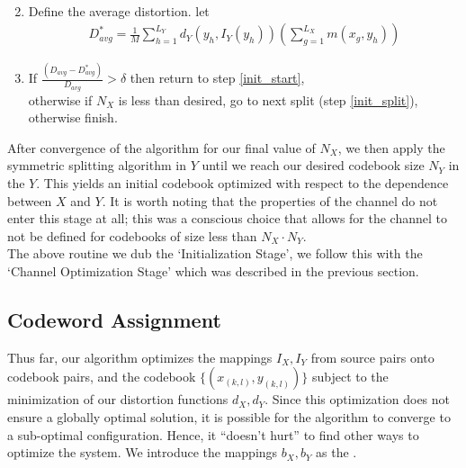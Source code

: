 \begin{enumerate}
\begin{align}
    \end{align}
    \item Define the average distortion. let
    \begin{align}
        D_{avg}^* = \frac{1}{M}\sum_{h=1}^{L_Y}d_Y(y_h, I_Y(y_h))\left(\sum_{g=1}^{L_X}m(x_g,y_h)\right)
    \end{align}
    \item If
        $\frac
        {(D_{avg} - D^*_{avg})}
        {D_{avg}}
        > \delta$
        then return to step \ref{init_start},\\
        otherwise if $N_X$ is less than desired, go to next split (step \ref{init_split}),\\
        otherwise finish.
\end{enumerate}

After convergence of the algorithm for our final value of $N_X$, we then apply the symmetric splitting algorithm in $Y$ until we reach our desired codebook size $N_Y$ in the $Y$. This yields an initial codebook optimized with respect to the dependence between $X$ and $Y$. It is worth noting that the properties of the channel do not enter this stage at all; this was a conscious choice that allows for the channel to not be defined for codebooks of size less than $N_X\cdot N_Y$.\\

The above routine we dub the `Initialization Stage', we follow this with the `Channel Optimization Stage' which was described in the previous section.



\subsection{Codeword Assignment}

Thus far, our algorithm optimizes the mappings $I_X, I_Y$ from source pairs onto codebook pairs, and the codebook $\{(x_{(k,l)}, y_{(k,l)})\}$ subject to the minimization of our distortion functions $d_X, d_Y$. Since this optimization does not ensure a globally optimal solution, it is possible for the algorithm to converge to a sub-optimal configuration. Hence, it ``doesn't hurt'' to find other ways to optimize the system. We introduce the mappings $b_X, b_Y$ as the .\\

